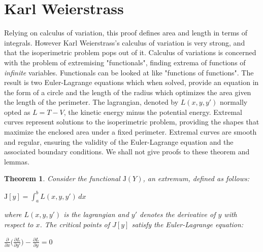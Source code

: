 \documentclass[a4paper]{book}
\newtheorem{theorem}{Theorem}%
\numberwithin{theorem}{section}%
\begin{document}
\section{Karl Weierstrass}
Relying on calculus of variation, this proof defines area and length in terms of integrals. However Karl Weierstrass's calculus of variation is very strong, and that the isoperimetric problem pops out of it. Calculus of variations is concerned with the problem of extremising "functionals", finding extrema of functions of \textit{infinite} variables. Functionals can be looked at like "functions of functions". The result is two Euler-Lagrange equations which when solved, provide an equation in the form of a circle and the length of the radius which optimizes the area given the length of the perimeter. The lagrangian, denoted by $L(x,y,y')$ normally opted as $L=T-V$, the kinetic energy minus the potential energy. Extremal curves represent solutions to the isoperimetric problem, providing the shapes that maximize the enclosed area under a fixed perimeter. Extremal curves are smooth and regular, ensuring the validity of the Euler-Lagrange equation and the associated boundary conditions. We shall not give proofs to these theorem and lemmas.
\begin{theorem}
	Consider the functional $\mathrm{J}(Y)$, an extremum, defined as follows:
	\begin{center}
		$\displaystyle \mathrm{J}[y]=\int_{a}^{b}L(x,y,y')\,dx$
	\end{center}
	where $L(x,y,y')$ is the lagrangian and $y'$ denotes the derivative of $y$ with respect to $x$. The critical points of $J[y]$ satisfy the Euler-Lagrange equation:
	\begin{center}
		$\displaystyle \frac{\partial}{\partial x}\Big(\frac{\partial L}{\partial y'}\Big)-\frac{\partial L}{\partial y}=0$
	\end{center}
\end{theorem}
\end{document}
